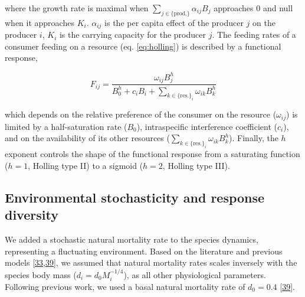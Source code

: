 \documentclass[
]{article}
\begin{document}
where the growth rate is maximal when \(\sum_{j \in \{\mathrm{prod.}\}} \alpha_{ij} B_j\) approaches \(0\) and null when it approaches \(K_i\). \(\alpha_{ij}\) is the per
capita effect of the producer \(j\) on the producer \(i\), \(K_i\) is the carrying
capacity for the producer \(j\). The feeding rates of a consumer feeding on
a resource (eq. \eqref{eq:holling}) is described by a functional response,

\begin{equation}
    \label{eq:holling}
    F_{ij} = \frac{\omega_{ij} B_j^h}
    {B_0^h + c_i B_i
        + \sum_{k \in \{\mathrm{res.}\}_i} \omega_{ik} B_k^h}
\end{equation}

which depends on the relative preference of the consumer on the resource
(\(\omega_{ij}\)) is limited by a half-saturation rate (\(B_0\)), intraspecific
interference coefficient (\(c_i\)), and on the availability of its other resources
(\(\sum_{k \in \{\mathrm{res.}\}_i} \omega_{ik} B_k^h\)). Finally, the \(h\)
exponent controls the shape of the functional response from a saturating
function (\(h = 1\), Holling type II) to a sigmoid (\(h = 2\), Holling type III).

\hypertarget{environmental-stochasticity-and-response-diversity}{%
\subsection{Environmental stochasticity and response diversity}\label{environmental-stochasticity-and-response-diversity}}

We added a stochastic natural mortality rate to the species dynamics,
representing a fluctuating environment. Based on the literature and previous
models {[}\protect\hyperlink{ref-hatton_linking_2019}{33},\protect\hyperlink{ref-vasseur_environmental_2007}{39}{]}, we assumed that natural mortality rates
scales inversely with the species body mass (\(d_i = d_0M_i^{-1/4}\)), as all
other physiological parameters. Following previous work, we used a basal
natural mortality rate of \(d_0 = 0.4\) {[}\protect\hyperlink{ref-vasseur_environmental_2007}{39}{]}.
\end{document}
